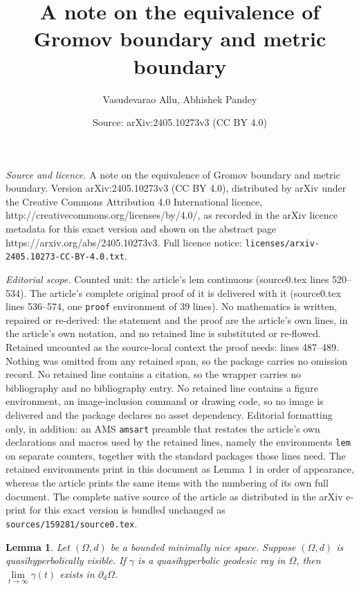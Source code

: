 \documentclass[10pt,a4paper]{amsart}
\title{A note on the equivalence of Gromov boundary and metric boundary}
\author{Vasudevarao Allu, Abhishek Pandey}
\date{Source: arXiv:2405.10273v3 (CC BY 4.0)}
\newtheorem{lem}{Lemma}
\begin{document}
\maketitle

\noindent\emph{Source and licence.} A note on the equivalence of Gromov boundary and metric boundary. Version arXiv:2405.10273v3 (CC BY 4.0), distributed by arXiv under the Creative Commons Attribution 4.0 International licence, http://creativecommons.org/licenses/by/4.0/, as recorded in the arXiv licence metadata for this exact version and shown on the abstract page https://arxiv.org/abs/2405.10273v3. Full licence notice: \texttt{licenses/arxiv-2405.10273-CC-BY-4.0.txt}.\par\smallskip

\noindent\textit{Editorial scope.} Counted unit: the article's lem continuous (source0.tex lines 520--534). The article's complete original proof of it is delivered with it (source0.tex lines 536--574, one \texttt{proof} environment of 39 lines). No mathematics is written, repaired or re-derived: the statement and the proof are the article's own lines, in the article's own notation, and no retained line is substituted or re-flowed.  Retained uncounted as the source-local context the proof needs: lines 487--489.  Nothing was omitted from any retained span, so the package carries no omission record.  No retained line contains a citation, so the wrapper carries no bibliography and no bibliography entry.  No retained line contains a figure environment, an image-inclusion command or drawing code, so no image is delivered and the package declares no asset dependency.  Editorial formatting only, in addition: an AMS \texttt{amsart} preamble that restates the article's own declarations and macros used by the retained lines, namely the environments \texttt{lem} on separate counters, together with the standard packages those lines need.  The retained environments print in this document as Lemma 1 in order of appearance, whereas the article prints the same items with the numbering of its own full document.  The complete native source of the article as distributed in the arXiv e-print for this exact version is bundled unchanged as \texttt{sources/159281/source0.tex}.
\begin{lem}\label{AV-P7-lem2}
	Let $(\Omega,d)$ be a bounded minimally nice space. Suppose $(\Omega,d)$ is quasihyperbolically visible. If $\gamma$ is a quasihyperbolic geodesic ray in $\Omega$, then $\lim\limits_{t\to \infty}\gamma(t)$ exists in $\partial_d\Omega$.
\end{lem}
\end{document}
